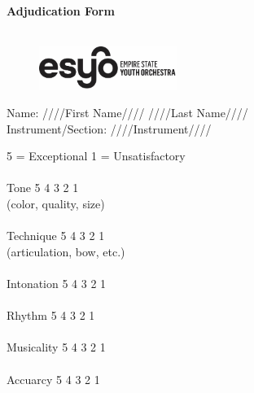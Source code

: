 \newpage
\indent\indent\indent\indent\indent\indent
\indent\indent\indent\indent\indent\indent
\Large\textbf{Adjudication Form}\\\\
\normalsize


\begin{figure}[t!]
\includegraphics[width=0.4\textwidth]{ESYOLogo.png}
\end{figure}

Name: ////First Name//// ////Last Name////\\
\newline
\newline
Instrument/Section: ////Instrument////\\
\newline
\newline

\hskip 3cm 5 = Exceptional \hskip 6.5cm 1 = Unsatisfactory\\\\

\hskip 0.75cm Tone  \hskip 2.8cm 5 \hskip 2cm 4 \hskip 2cm 3 \hskip 2cm 2 \hskip 2cm 1\\
(color, quality, size)\\\\

\hskip 0.75cm Technique  \hskip 2cm 5 \hskip 2cm 4 \hskip 2cm 3 \hskip 2cm 2 \hskip 2cm 1\\
(articulation, bow, etc.)\\\\

\hskip 0.75cm Intonation  \hskip 2cm 5 \hskip 2cm 4 \hskip 2cm 3 \hskip 2cm 2 \hskip 2cm 1\\\\

\hskip 1.15cm Rhythm  \hskip 2cm 5 \hskip 2cm 4 \hskip 2cm 3 \hskip 2cm 2 \hskip 2cm 1\\\\

\hskip 0.85cm Musicality \hskip 2cm 5 \hskip 2cm 4 \hskip 2cm 3 \hskip 2cm 2 \hskip 2cm 1\\\\

\hskip 1.05cm Accuarcy  \hskip 2cm 5 \hskip 2cm 4 \hskip 2cm 3 \hskip 2cm 2 \hskip 2cm 1\\\\


